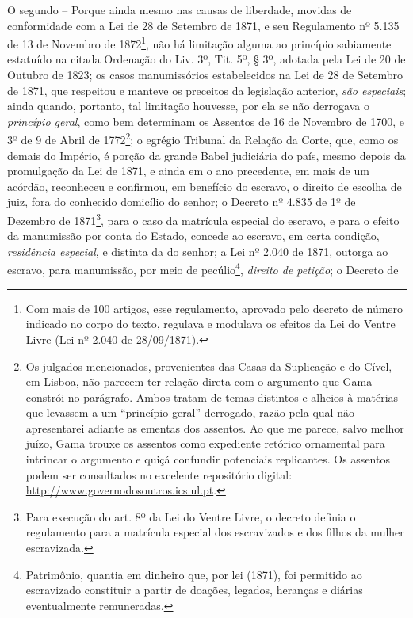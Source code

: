 O segundo -- Porque ainda mesmo nas causas de liberdade, movidas de
conformidade com a Lei de 28 de Setembro de 1871, e seu Regulamento nº
5.135 de 13 de Novembro de 1872\footnote{Com mais de 100 artigos, esse
  regulamento, aprovado pelo decreto de número indicado no corpo do
  texto, regulava e modulava os efeitos da Lei do Ventre Livre (Lei nº
  2.040 de 28/09/1871).}, não há limitação alguma ao princípio
sabiamente estatuído na citada Ordenação do Liv. 3º, Tit. 5º, § 3º,
adotada pela Lei de 20 de Outubro de 1823; os casos manumissórios
estabelecidos na Lei de 28 de Setembro de 1871, que respeitou e manteve
os preceitos da legislação anterior, \emph{são especiais}; ainda quando,
portanto, tal limitação houvesse, por ela se não derrogava o
\emph{princípio geral}, como bem determinam os Assentos de 16 de
Novembro de 1700, e 3º de 9 de Abril de 1772\footnote{Os julgados
  mencionados, provenientes das Casas da Suplicação e do Cível, em
  Lisboa, não parecem ter relação direta com o argumento que Gama
  constrói no parágrafo. Ambos tratam de temas distintos e alheios à
  matérias que levassem a um ``princípio geral'' derrogado, razão pela
  qual não apresentarei adiante as ementas dos assentos. Ao que me
  parece, salvo melhor juízo, Gama trouxe os assentos como expediente
  retórico ornamental para intrincar o argumento e quiçá confundir
  potenciais replicantes. Os assentos podem ser consultados no excelente
  repositório digital:
  \href{http://www.governodosoutros.ics.ul.pt/}{{http://www.governodosoutros.ics.ul.pt}}.};
o egrégio Tribunal da Relação da Corte, que, como os demais do Império,
é porção da grande Babel judiciária do país, mesmo depois da promulgação
da Lei de 1871, e ainda em o ano precedente, em mais de um acórdão,
reconheceu e confirmou, em benefício do escravo, o direito de escolha de
juiz, fora do conhecido domicílio do senhor; o Decreto nº 4.835 de 1º de
Dezembro de 1871\footnote{Para execução do art. 8º da Lei do Ventre
  Livre, o decreto definia o regulamento para a matrícula especial dos
  escravizados e dos filhos da mulher escravizada.}, para o caso da
matrícula especial do escravo, e para o efeito da manumissão por conta
do Estado, concede ao escravo, em certa condição, \emph{residência
especial}, e distinta da do senhor; a Lei nº 2.040 de 1871, outorga ao
escravo, para manumissão, por meio de pecúlio\footnote{Patrimônio,
  quantia em dinheiro que, por lei (1871), foi permitido ao escravizado
  constituir a partir de doações, legados, heranças e diárias
  eventualmente remuneradas.}, \emph{direito de petição}; o Decreto de
